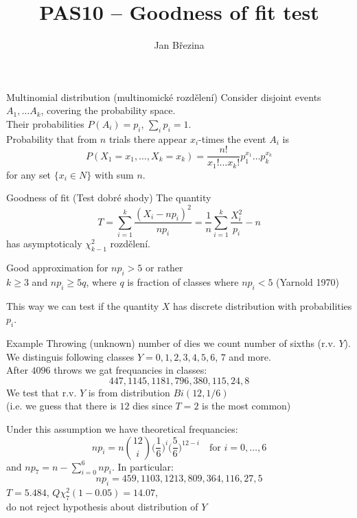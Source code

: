 \documentclass[smaller]{beamer}
\title{PAS10 -- Goodness of fit test}
\author{Jan B\v rezina}
\institute %
{
  Technical University of Liberec
}
\def\xskip{{\vspace{2ex}}}
\def\cz#1{{\small (#1)}}
\begin{document}
\begin{frame}
  \titlepage
\end{frame}

\begin{frame}{Multinomial distribution \cz{multinomické rozdělení} }
Consider disjoint events $A_1,\dots A_k$, covering the probability space.\\
Their probabilities $P(A_i) = p_i$, $\sum_i p_i =1$.\\

\xskip
Probability that from $n$ trials there appear  $x_i$-times the event $A_i$ is
\[
 P(X_1 = x_1,\dots, X_k = x_k) = \frac{n!}{x_1!\dots x_k!}p_1^{x_1} \dots p_k^{x_k}
\]
for any set $\{x_i\in N \}$ with sum $n$.

\end{frame}

\begin{frame}{Goodness of fit \cz{Test dobré shody}}
\xskip
The quantity 
\[
 T=\sum_{i=1}^k \frac{ (X_i - np_i)^2}{np_i} = \frac{1}{n}\sum_{i=1}^k \frac{X_i^2}{p_i} - n
\]
has asymptoticaly $\chi^2_{k-1}$ rozdělení. 

\xskip
Good approximation for $np_i >5$ or rather\\
$k\ge 3$ and $np_i \ge 5q$, where $q$ is fraction of classes where $np_i<5$ (Yarnold 1970)

\xskip
This way we can test if the quantity $X$ has discrete distribution with probabilities $p_i$.
\end{frame}

\begin{frame}{Example}
 Throwing (unknown) number of dies we count number of sixths (r.v. $Y$).\\
 We distinguis following classes $Y=0,1,2,3,4,5,6$, $7$ and more.\\
 After $4096$ throws we gat frequancies in classes:
\[
 447, 1145, 1181, 796, 380, 115, 24, 8
\]
We test that r.v. $Y$ is from distribution  $Bi(12, 1/6)$\\
(i.e. we guess that there is $12$ dies since $T=2$ is the most common)

Under this assumption we have theoretical frequancies:
\[
 np_i = n \binom{12}{i}\Big(\frac{1}{6}\Big)^i \Big(\frac{5}{6}\Big)^{12-i}
 \quad\text{for $i=0,\dots,6$}
\]
and $np_7 = n- \sum_{i=0}^6 np_i$. In particular:
\[
np_i = 459, 1103, 1213, 809, 364, 116, 27, 5
\]
$T = 5.484 $, $Q\chi^2_{7}(1-0.05) = 14.07$,\\
do not reject hypothesis about distribution of $Y$

\end{frame}
\end{document}
